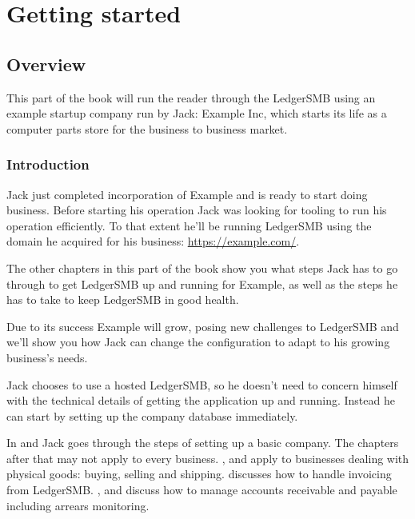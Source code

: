 

\part{Getting started}
\label{part-getting-started}

\chapter{Overview}
\label{cha-starting-overviev}

This part of the book will run the reader through the LedgerSMB using an example
startup company run by Jack: Example Inc, which starts its life as a computer parts
store for the business to business market.

\section{Introduction}
\label{sec-starting-introduction}

Jack just completed incorporation of Example and is ready to start doing business.
Before starting his operation Jack was looking for tooling to run his operation
efficiently. To that extent he'll be running LedgerSMB using the domain he acquired
for his business: \url{https://example.com/}.

The other chapters in this part of the book show you what steps Jack has to go through
to get LedgerSMB up and running for Example, as well as the steps he has to take to
keep LedgerSMB in good health.

Due to its success Example will grow, posing new challenges to LedgerSMB and we'll show
you how Jack can change the configuration to adapt to his growing business's needs.

Jack chooses to use a hosted LedgerSMB, so he doesn't need to concern himself with the
technical details of getting the application up and running. Instead he can start by setting
up the company database immediately.

In  and  Jack goes through the
steps of setting up a basic company. The chapters after that may not apply to every
business. ,  and
 apply to businesses dealing with physical goods: buying,
selling and shipping.  discusses how to handle invoicing from LedgerSMB.
,  and 
discuss how to manage accounts receivable and payable including arrears monitoring.

